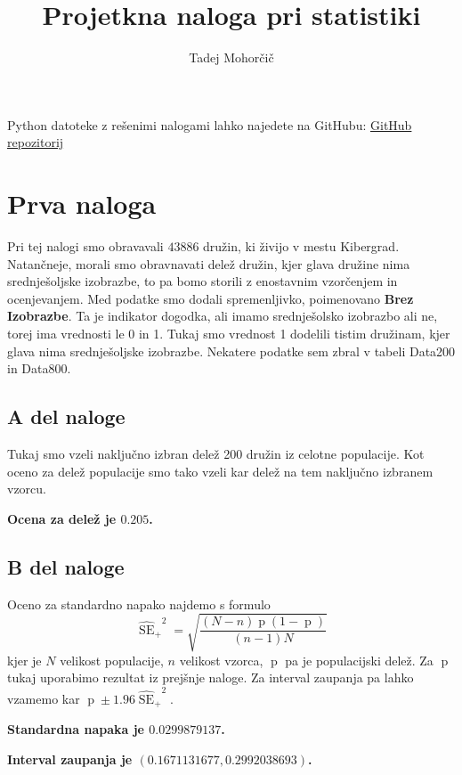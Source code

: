 \documentclass{article}
\title{Projetkna naloga pri statistiki}
\author{Tadej Mohorčič}
\date{}
\DeclareMathOperator{\se}{SE}
\DeclareMathOperator{\de}{p}
\begin{document}
    
    \maketitle

    Python datoteke z rešenimi nalogami lahko najedete na GitHubu: \href{https://github.com/TadejMohorcic/Statistika}{GitHub repozitorij}


    \section{Prva naloga}
    Pri tej nalogi smo obravavali $43886$ družin, ki živijo v mestu Kibergrad. Natančneje, morali smo obravnavati delež družin, kjer glava družine nima srednješoljske izobrazbe,
    to pa bomo storili z enostavnim vzorčenjem in ocenjevanjem. Med podatke smo dodali spremenljivko, poimenovano \textbf{Brez Izobrazbe}. Ta je indikator dogodka, ali imamo
    srednješolsko izobrazbo ali ne, torej ima vrednosti le 0 in 1. Tukaj smo vrednost 1 dodelili tistim družinam, kjer glava nima srednješoljske izobrazbe. Nekatere podatke sem
    zbral v tabeli Data200 in Data800.

    \subsection{A del naloge}
    Tukaj smo vzeli naključno izbran delež 200 družin iz celotne populacije. Kot oceno za delež populacije smo tako vzeli kar delež na tem naključno izbranem vzorcu.
    \par \textbf{Ocena za delež je $0.205$.}

    \subsection{B del naloge}
    Oceno za standardno napako najdemo s formulo
    \[
        {\widehat{\se}_{+}}^2 = \sqrt{\frac{(N - n)\de(1 - \de)}{(n - 1)N}}
    \]
    kjer je $N$ velikost populacije, $n$ velikost vzorca, $\de$ pa je populacijski delež. Za $\de$ tukaj uporabimo rezultat iz prejšnje naloge. Za interval zaupanja pa lahko
    vzamemo kar $\de \pm 1.96{\widehat{\se}_{+}}^2$.
    \par \textbf{Standardna napaka je $0.0299879137$.}
    \par \textbf{Interval zaupanja je $(0.1671131677, 0.2992038693)$.}
\end{document}
